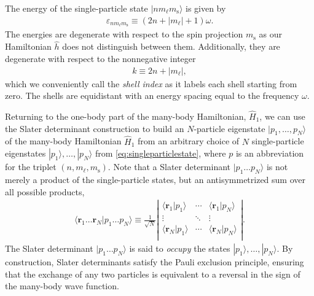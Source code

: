 The energy of the single-particle state $|n m_\ell m_{\mathrm{s}}\rangle$ is given by
\begin{align} \label{eq:energysingleparticlestate}
  \varepsilon_{n m_\ell m_{\mathrm{s}}} \equiv (2 n + |m_\ell| + 1) \omega.
\end{align}
The energies are degenerate with respect to the spin projection $m_{\mathrm{s}}$ as our Hamiltonian $\hat{h}$ does not distinguish between them.  Additionally, they are degenerate with respect to the nonnegative integer
\begin{align} \label{eq:shell_index}
  k \equiv 2 n + |m_\ell|,
\end{align}
which we conveniently call the \textit{shell index} as it labels each shell starting from zero.  The shells are equidistant with an energy spacing equal to the frequency $\omega$.

Returning to the one-body part of the many-body Hamiltonian, $\hat{H}_1$, we can use the Slater determinant construction to build an $N$-particle eigenstate $|p_1, \ldots, p_N\rangle$ of the many-body Hamiltonian $\hat{H}_1$ from an arbitrary choice of $N$ single-particle eigenstates $|p_1\rangle, \ldots, |p_N\rangle$ from \eqref{eq:singleparticlestate}, where $p$ is an abbreviation for the triplet $(n, m_\ell, m_{\mathrm{s}})$.  Note that a Slater determinant $|p_1 \ldots p_N\rangle$ is not merely a product of the single-particle states, but an antisymmetrized sum over all possible products,
\begin{align*}
  \langle \bm{r}_1 \ldots \bm{r}_N | p_1 \ldots p_N \rangle \equiv
  \frac{1}{\sqrt{N}} \left|
  \begin{matrix}
    \langle \bm{r}_1 | p_1 \rangle & \cdots & \langle \bm{r}_1 | p_N \rangle \\
    \vdots & \ddots & \vdots \\
    \langle \bm{r}_N | p_1 \rangle & \cdots & \langle \bm{r}_N | p_N \rangle \\
  \end{matrix}
  \right|.
\end{align*}
The Slater determinant $|p_1 \ldots p_N\rangle$ is said to \textit{occupy} the states $|p_1\rangle, \ldots, |p_N\rangle$.  By construction, Slater determinants satisfy the Pauli exclusion principle, ensuring that the exchange of any two particles is equivalent to a reversal in the sign of the many-body wave function.


